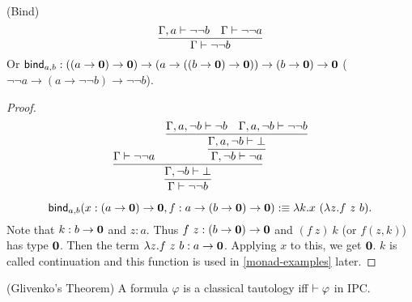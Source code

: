 \newcommand{\bind}{\name{bind}}
\begin{lemma}
    \label{bind-ipc}
    (Bind)
    $$
        \infer{\Gamma\proves\neg\neg b}{
            \Gamma,a\proves\neg\neg b
             & \Gamma\proves\neg\neg a
        }
    $$
    Or $\bind_{a,b}:((a\to \zero)\to\zero)\to(a\to((b\to \zero)\to \zero))\to (b\to \zero)\to \zero$
    ($\neg\neg a\to (a\to \neg\neg b)\to \neg\neg b$).
\end{lemma}
\begin{proof}
    $$
    \infer{\Gamma\proves\neg\neg b}{\infer{\Gamma,\neg b\proves\bot}{
        \Gamma\proves\neg\neg a &
        \infer{\Gamma,\neg b\proves\neg a}{
            \infer{\Gamma,a,\neg b\proves\bot}{
                \Gamma,a,\neg b\proves\neg b
                &
                \Gamma,a,\neg b\proves\neg\neg b
            }
        }
    }}
    $$

    $$
    \bind_{a,b}(x:(a\to\zero)\to \zero, f: a\to(b\to \zero)\to\zero)
    \defn \lambda k. x\ (\lambda z. f\ z\ b).
    $$
    Note that $k: b\to \mathbf{0}$ and $z: a$. Thus $f\ z:(b\to\mathbf{0})\to\mathbf{0}$
    and $(f\ z)\ k$ (or $f(z,k)$) has type $\mathbf{0}$. Then the term
    $\lambda z.f\ z\ b: a\to\mathbf{0}$. Applying $x$ to this, we get $\mathbf{0}$.
    $k$ is called continuation and this function is used in 
    \autoref{monad-examples} later.
\end{proof}
\begin{theorem}
    \label{glivenko-theorem}
    (Glivenko's Theorem) A formula $\varphi$ is a classical tautology
    iff $\vdash\varphi$ in IPC. 
\end{theorem}
